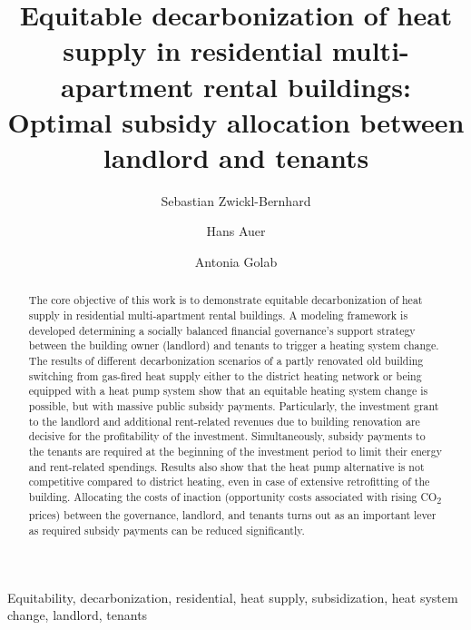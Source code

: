 \documentclass[review]{elsarticle}
\begin{document}
\begin{frontmatter}

\title{Equitable decarbonization of heat supply in residential multi-apartment rental buildings: Optimal subsidy allocation between landlord and tenants}
\author[1]{Sebastian Zwickl-Bernhard}
\author[1]{Hans Auer}
\author[1]{Antonia Golab}
\address[1]{Energy Economics Group (EEG), Technische Universität Wien, Gusshausstrasse 25-29/E370-3, 1040 Wien, Austria}

\begin{abstract}
	The core objective of this work is to demonstrate equitable decarbonization of heat supply in residential multi-apartment rental buildings. A modeling framework is developed determining a socially balanced financial governance's support strategy between the building owner (landlord) and tenants to trigger a heating system change. The results of different decarbonization scenarios of a partly renovated old building switching from gas-fired heat supply either to the district heating network or being equipped with a heat pump system show that an equitable heating system change is possible, but with massive public subsidy payments. Particularly, the investment grant to the landlord and additional rent-related revenues due to building renovation are decisive for the profitability of the investment. Simultaneously, subsidy payments to the tenants are required at the beginning of the investment period to limit their energy and rent-related spendings. Results also show that the heat pump alternative is not competitive compared to district heating, even in case of extensive retrofitting of the building. Allocating the costs of inaction (opportunity costs associated with rising CO\textsubscript{2} prices) between the governance, landlord, and tenants turns out as an important lever as required subsidy payments can be reduced significantly.
\end{abstract}

\begin{keyword}
	Equitability, decarbonization, residential, heat supply, subsidization, heat system change, landlord, tenants
	
\end{keyword}
\end{frontmatter}
\end{document}
